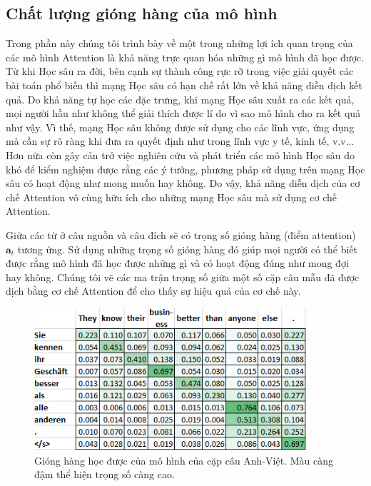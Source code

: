 \subsection{Chất lượng gióng hàng của mô hình}
Trong phần này chúng tôi trình bày về một trong những lợi ích quan trọng của các mô hình Attention là khả năng trực quan hóa những gì mô hình đã học được. Từ khi Học sâu ra đời, bên cạnh sự thành công rực rỡ trong việc giải quyết các bài toán phổ biến thì mạng Học sâu có hạn chế rất lớn về khả năng diễn dịch kết quả. Do khả năng tự học các đặc trưng, khi mạng Học sâu xuất ra các kết quả, mọi người hầu như không thể giải thích được lí do vì sao mô hình cho ra kết quả như vậy. Vì thế, mạng Học sâu không được sử dụng cho các lĩnh vực, ứng dụng mà cần sự rõ ràng khi đưa ra quyết định như trong lĩnh vực y tế, kinh tế, v.v... Hơn nữa còn gây cản trở việc nghiên cứu và phát triển các mô hình Học sâu do khó để kiểm nghiệm được rằng các ý tưởng, phương pháp sử dụng trên mạng Học sâu có hoạt động như mong muốn hay không. Do vậy, khả năng diễn dịch của cơ chế Attention vô cùng hữu ích cho những mạng Học sâu mà sử dụng cơ chế Attention.

Giữa các từ ở câu nguồn và câu đích sẽ có trọng số gióng hàng (điểm attention) $\bm{a}_t$ tương ứng. Sử dụng những trọng số gióng hàng đó giúp mọi người có thể biết được rằng mô hình đã học được những gì và có hoạt động đúng như mong đợi hay không. Chúng tôi vẽ các ma trận trọng số giữa một số cặp câu mẫu đã được dịch bằng cơ chế Attention để cho thấy sự hiệu quả của cơ chế này.

\begin{figure}
	\centering
	\includegraphics[width=0.9\textwidth]{en-de_attn-weights_31.PNG}
	\caption[Gióng hàng học được của mô hình của cặp câu Anh-Việt.]{Gióng hàng học được của mô hình của cặp câu Anh-Việt. Màu càng đậm thể hiện trọng số càng cao.}
	\label{fig_en-de_attn-weights_31}
\end{figure}


